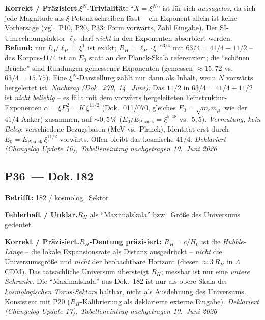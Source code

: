 \smallskip\noindent\textbf{Korrekt / Präzisiert.}\quad \textbf{$\xi^N$-Trivialität:} \enquote{$X = \xi^N$} ist für sich \emph{aussagelos}, da sich jede Magnitude als $\xi$-Potenz schreiben lässt -- ein Exponent allein ist keine Vorhersage (vgl.\ P10, P20, P33: Form vorwärts, Zahl Eingabe). Der SI-Umrechnungsfaktor $\ell_P$ darf \emph{nicht} in den Exponenten absorbiert werden. \textbf{Befund:} nur $L_0/\ell_P = \xi^1$ ist exakt; $R_H = \ell_P\cdot\xi^{-63/4}$ mit $63/4 = 41/4 + 11/2$ -- das Korpus-$41/4$ ist an $E_0$ statt an der Planck-Skala referenziert; die \enquote{schönen Brüche} sind Rundungen gemessener Exponenten (gemessen $\approx 15{,}72$ vs.\ $63/4 = 15{,}75$). Eine $\xi^N$-Darstellung zählt nur dann als Inhalt, wenn $N$ vorwärts hergeleitet ist. \emph{Nachtrag (Dok.~279, 14.~Juni):} Das $11/2$ in $63/4=41/4+11/2$ ist \emph{nicht beliebig} -- es fällt mit dem vorwärts hergeleiteten Feinstruktur-Exponenten $\alpha=\xi E_0^2=K\,\xi^{11/2}$ (Dok.~011/070, gleiches $E_0=\sqrt{m_em_\mu}$ wie der $41/4$-Anker) zusammen, auf $\sim0{,}5\,\%$ ($E_0/E_\text{Planck}=\xi^{5{,}48}$ vs.\ $5{,}5$). \emph{Vermutung, kein Beleg}: verschiedene Bezugsbasen (MeV vs.\ Planck), Identität erst durch $E_0=E_\text{Planck}\,\xi^{11/2}$ vorwärts. Offen bleibt das kosmische $41/4$. \emph{Deklariert (Changelog Update 16), Tabelleneintrag nachgetragen 10.~Juni 2026}


\medskip


\subsection*{P36~--- Dok.\,182}

\noindent\textbf{Betrifft:} 182 / kosmolog.\ Sektor


\smallskip\noindent\textbf{Fehlerhaft / Unklar.}\quad $R_H$ als \enquote{Maximalskala} bzw.\ Größe des Universums gedeutet


\smallskip\noindent\textbf{Korrekt / Präzisiert.}\quad \textbf{$R_H$-Deutung präzisiert:} $R_H = c/H_0$ ist die \emph{Hubble-Länge} -- die lokale Expansionsrate als Distanz ausgedrückt -- \emph{nicht} die Universumsgröße und \emph{nicht} der beobachtbare Horizont (dieser $\approx 3\,R_H$ in $\Lambda$CDM). Das tatsächliche Universum übersteigt $R_H$; messbar ist nur eine \emph{untere Schranke}. Die \enquote{Maximalskala} aus Dok.~182 ist nur als obere Skala des \emph{kosmologischen Torus-Sektors} haltbar, nicht als Ausdehnung des Universums. Konsistent mit P20 ($R_H$-Kalibrierung als deklarierte externe Eingabe). \emph{Deklariert (Changelog Update 17), Tabelleneintrag nachgetragen 10.~Juni 2026}


